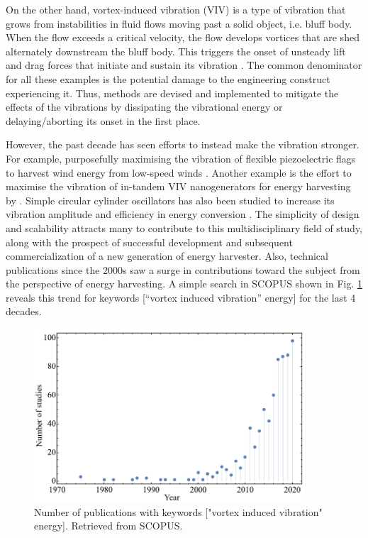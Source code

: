\documentclass[oneside]{utmthesis}
\begin{document}
On the other hand, vortex-induced vibration (VIV) is a type of vibration that grows from instabilities in fluid flows moving past a solid object, i.e. bluff body. When the flow exceeds a critical velocity, the flow develops vortices that are shed alternately downstream the bluff body. This triggers the onset of unsteady lift and drag forces that initiate and sustain its vibration \citep{Bukka2020}. The common denominator for all these examples is the potential damage to the engineering construct experiencing it. Thus, methods are devised and implemented to mitigate the effects of the vibrations by dissipating the vibrational energy or delaying/aborting its onset in the first place.

However, the past decade has seen efforts to instead make the vibration stronger. For example, purposefully maximising the vibration of flexible piezoelectric flags to harvest wind energy from low-speed winds \citep{Mehdipour2022}. Another example is the effort to maximise the vibration of in-tandem VIV nanogenerators for energy harvesting by \citep{Zhang2022a}. Simple circular cylinder oscillators has also been studied to increase its vibration amplitude and efficiency in energy conversion \citep{Zhang2022b}.
The simplicity of design and scalability attracts many to contribute to this multidisciplinary field of study, along with the prospect of successful development and subsequent commercialization of a new generation of energy harvester.
Also, technical publications since the 2000s saw a surge in contributions toward the subject from the perspective of energy harvesting. A simple search in SCOPUS shown in Fig. \ref{fig:scopusTrend} reveals this trend for keywords [“vortex induced vibration” energy] for the last 4 decades.

\begin{figure}[H]
  \centering
  \includegraphics[width=0.9\textwidth]{figs/scopusTrend}
  \caption{Number of publications with keywords ["vortex induced vibration" energy]. Retrieved from SCOPUS.}
  \label{fig:scopusTrend}
\end{figure}
\end{document}
